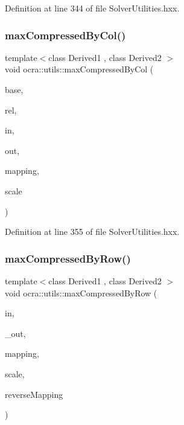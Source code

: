 Definition at line 344 of file Solver\+Utilities.\+hxx.

\hypertarget{namespaceocra_1_1utils_a86da8040ccbcb2a583b7e628dc8265ea}{}\label{namespaceocra_1_1utils_a86da8040ccbcb2a583b7e628dc8265ea} 
\subsubsection{\texorpdfstring{max\+Compressed\+By\+Col()}{maxCompressedByCol()}\hspace{0.1cm}{\footnotesize\ttfamily [2/2]}}
{\footnotesize\ttfamily template$<$class Derived1 , class Derived2 $>$ \\
void ocra\+::utils\+::max\+Compressed\+By\+Col (\begin{DoxyParamCaption}\item[{const \hyperlink{classocra_1_1Variable}{Variable} \&}]{base,  }\item[{const \hyperlink{classocra_1_1Variable}{Variable} \&}]{rel,  }\item[{const Matrix\+Base$<$ Derived1 $>$ \&}]{in,  }\item[{Matrix\+Base$<$ Derived2 $>$ const \&}]{out,  }\item[{std\+::vector$<$ int $>$ \&}]{mapping,  }\item[{double}]{scale }\end{DoxyParamCaption})\hspace{0.3cm}{\ttfamily [inline]}}



Definition at line 355 of file Solver\+Utilities.\+hxx.

\hypertarget{namespaceocra_1_1utils_a6216ad7fe2fb3ce0e894167f8f7d08b8}{}\label{namespaceocra_1_1utils_a6216ad7fe2fb3ce0e894167f8f7d08b8} 
\subsubsection{\texorpdfstring{max\+Compressed\+By\+Row()}{maxCompressedByRow()}\hspace{0.1cm}{\footnotesize\ttfamily [1/2]}}
{\footnotesize\ttfamily template$<$class Derived1 , class Derived2 $>$ \\
void ocra\+::utils\+::max\+Compressed\+By\+Row (\begin{DoxyParamCaption}\item[{const Matrix\+Base$<$ Derived1 $>$ \&}]{in,  }\item[{Matrix\+Base$<$ Derived2 $>$ const \&}]{\+\_\+out,  }\item[{const std\+::vector$<$ int $>$ \&}]{mapping,  }\item[{double}]{scale,  }\item[{bool}]{reverse\+Mapping }\end{DoxyParamCaption})\hspace{0.3cm}{\ttfamily [inline]}}



